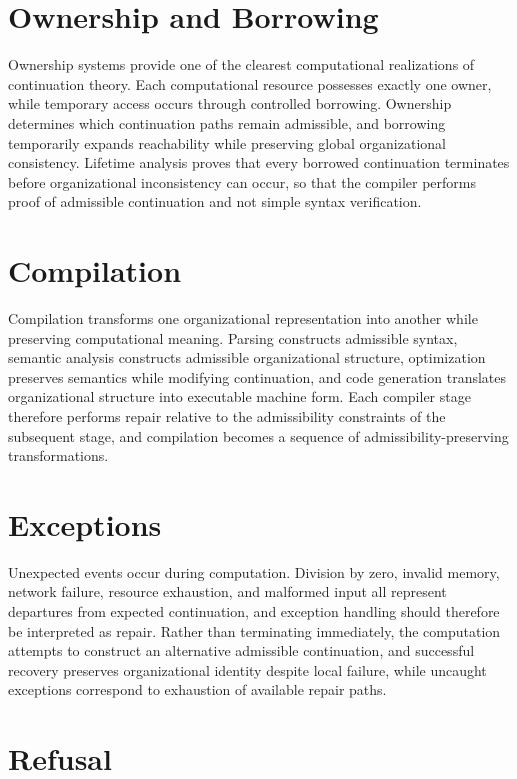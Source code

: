 \documentclass[11pt,oneside]{book}
\numberwithin{equation}{chapter}
\theoremstyle{definition}
\theoremstyle{plain}
\begin{document}
\section{Ownership and Borrowing}

Ownership systems provide one of the clearest computational realizations of continuation theory. Each computational resource possesses exactly one owner, while temporary access occurs through controlled borrowing. Ownership determines which continuation paths remain admissible, and borrowing temporarily expands reachability while preserving global organizational consistency. Lifetime analysis proves that every borrowed continuation terminates before organizational inconsistency can occur, so that the compiler performs proof of admissible continuation and not simple syntax verification.

\section{Compilation}

Compilation transforms one organizational representation into another while preserving computational meaning. Parsing constructs admissible syntax, semantic analysis constructs admissible organizational structure, optimization preserves semantics while modifying continuation, and code generation translates organizational structure into executable machine form. Each compiler stage therefore performs repair relative to the admissibility constraints of the subsequent stage, and compilation becomes a sequence of admissibility-preserving transformations.

\section{Exceptions}

Unexpected events occur during computation. Division by zero, invalid memory, network failure, resource exhaustion, and malformed input all represent departures from expected continuation, and exception handling should therefore be interpreted as repair. Rather than terminating immediately, the computation attempts to construct an alternative admissible continuation, and successful recovery preserves organizational identity despite local failure, while uncaught exceptions correspond to exhaustion of available repair paths.

\section{Refusal}
\end{document}
